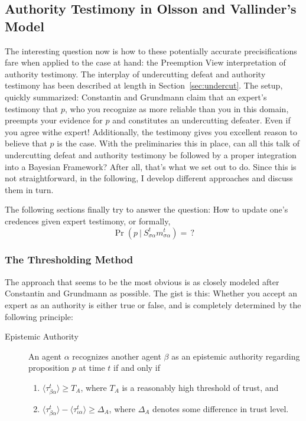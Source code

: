 \documentclass[11pt, a4paper]{scrartcl}
\newcommand{\Stsa}{S^t_{\sigma\alpha}}
\newcommand{\sa}{{\sigma\alpha}}
\newcommand{\given}[1][]{\:#1\vert\:}
\newcommand{\Sm}{\Stsa{}m^t_{\sa}}
\begin{document}
\subsection{Authority Testimony in Olsson and Vallinder's Model}

The interesting question now is how to these potentially accurate precisifications fare when applied to the case at hand: the Preemption View interpretation of authority testimony. The interplay of undercutting defeat and authority testimony has been described at length in Section~\ref{sec:undercut}. The setup, quickly summarized: Constantin and Grundmann claim that an expert's testimony that $p$, who you recognize as more reliable than you in this domain, preempts your evidence for $p$ and constitutes an undercutting defeater. Even if you agree withe expert! Additionally, the testimony gives you excellent reason to believe that $p$ is the case.  
With the preliminaries this in place, can all this talk of undercutting defeat and authority testimony be followed by a proper integration into a Bayesian Framework? After all, that's what we set out to do. Since this is not straightforward, in the following, I develop different approaches and discuss them in turn.

The following sections finally try to answer the question: How to update one's credences given expert testimony, or formally, 
\[
    \Pr(p \given \Sm) =\,?
\]
\subsubsection{The Thresholding Method}

The approach that seems to be the most obvious is as closely modeled after Constantin and Grundmann as possible. The gist is this: Whether you accept an expert as an authority is either true or false, and is completely determined by the following principle: 

\begin{description} 
    \item[Epistemic Authority] An agent $\alpha$ recognizes another agent $\beta$ as an epistemic authority regarding proposition $p$ at time $t$ if and only if  
    \begin{enumerate}[label= (\roman*)]
        \item $\langle \tau^t_{\beta\alpha} \rangle \geqslant T_A$, where $T_A$ is a reasonably high threshold of trust, and
        \item $\langle \tau^t_{\beta\alpha} \rangle - \langle \tau^t_{\iota\alpha} \rangle \geqslant \Delta_A$, where $\Delta_A$ denotes some difference in trust level.
    \end{enumerate}
\end{description}
\end{document}
